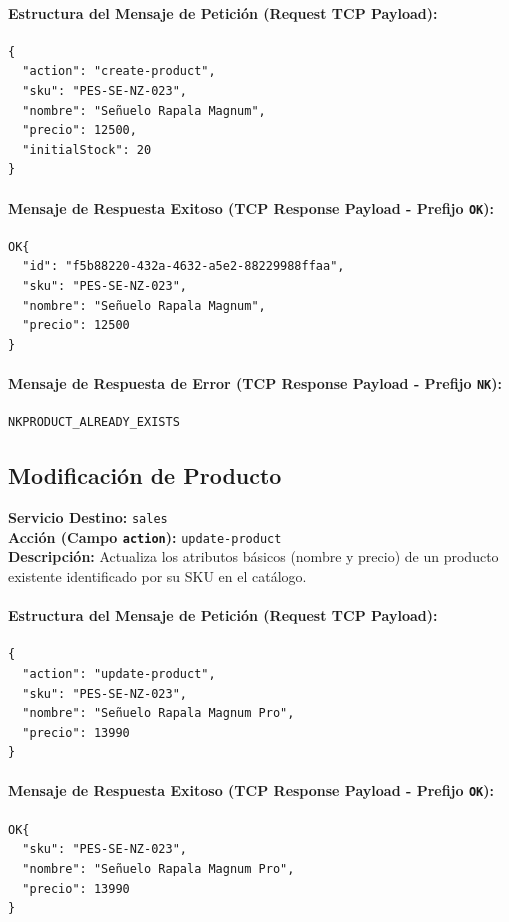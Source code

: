 \documentclass[12pt,a4paper]{article}
\begin{document}
\paragraph{Estructura del Mensaje de Petición (Request TCP Payload):}
\begin{verbatim}
{
  "action": "create-product",
  "sku": "PES-SE-NZ-023",
  "nombre": "Señuelo Rapala Magnum",
  "precio": 12500,
  "initialStock": 20
}
\end{verbatim}

\paragraph{Mensaje de Respuesta Exitoso (TCP Response Payload - Prefijo \texttt{OK}):}
\begin{verbatim}
OK{
  "id": "f5b88220-432a-4632-a5e2-88229988ffaa",
  "sku": "PES-SE-NZ-023",
  "nombre": "Señuelo Rapala Magnum",
  "precio": 12500
}
\end{verbatim}

\paragraph{Mensaje de Respuesta de Error (TCP Response Payload - Prefijo \texttt{NK}):}
\begin{verbatim}
NKPRODUCT_ALREADY_EXISTS
\end{verbatim}

\subsection{Modificación de Producto}
\textbf{Servicio Destino:} \texttt{sales} \\
\textbf{Acción (Campo \texttt{action}):} \texttt{update-product} \\
\textbf{Descripción:} Actualiza los atributos básicos (nombre y precio) de un producto existente identificado por su SKU en el catálogo.

\paragraph{Estructura del Mensaje de Petición (Request TCP Payload):}
\begin{verbatim}
{
  "action": "update-product",
  "sku": "PES-SE-NZ-023",
  "nombre": "Señuelo Rapala Magnum Pro",
  "precio": 13990
}
\end{verbatim}

\paragraph{Mensaje de Respuesta Exitoso (TCP Response Payload - Prefijo \texttt{OK}):}
\begin{verbatim}
OK{
  "sku": "PES-SE-NZ-023",
  "nombre": "Señuelo Rapala Magnum Pro",
  "precio": 13990
}
\end{verbatim}
\end{document}
